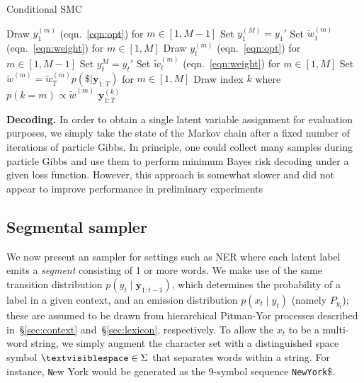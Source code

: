 \documentclass[11pt]{article}
\newcommand{\EOS}{\$}
\newcommand{\delim}{\textvisiblespace}
\begin{document}
\begin{algorithm}[t]
   \caption{Conditional SMC}\label{alg:pgkernel}
   \begin{algorithmic}[1] 
     \State Draw $y_1^{(m)}$ (eqn.\ \ref{eqn:opt}) for $m \in [1, M-1]$
     \State Set $y_1^{(M)} = y_1'$ 
     \State Set $\tilde{w}_1^{(m)}$ (eqn.\ \ref{eqn:weight}) for $m \in [1, M]$
     \State Draw $y_t^{(m)}$ (eqn.\ \ref{eqn:opt}) for $m \in [1, M-1]$
     \State Set $y_t^{M} = y_t'$ 
     \State Set $\tilde{w}_t^{(m)}$ (eqn.\ \ref{eqn:weight}) for $m \in [1, M]$
     \EndFor
     \State Set $\tilde{w}^{(m)} \!=\! \tilde{w}_T^{(m)}p(\EOS|\bm{y}_{1:T})$ for $m \in [1, M]$
     \State Draw index $k$ where $p(k=m) \propto \tilde{w}^{(m)}$
     \State \Return $\bm{y}^{(k)}_{1:T}$
     \EndProcedure
   \end{algorithmic}
\end{algorithm}

\vspace{5pt}

\noindent \textbf{Decoding.} In order to obtain a single latent
variable assignment for evaluation purposes, we simply take the state of the
Markov chain after a fixed number of iterations of particle Gibbs. In
principle, one could collect many samples during particle Gibbs and use them
to perform minimum Bayes risk decoding
under a given loss function.  However, this approach is somewhat slower and did
not appear to improve performance in preliminary experiments

\subsection{Segmental sampler}\label{sec:inf2}

We now present an sampler for settings such as NER where each latent label emits a {\em segment} consisting of 1 or more words.
We make use of the same transition distribution $p(y_t \mid \bm{y}_{1:t-1})$, which determines the probability of a label in a given context, and an emission
distribution $p(x_t \mid y_t)$ (namely $P_{y_t}$); these are assumed to be drawn from hierarchical Pitman-Yor processes described in~\S\ref{sec:context} and~\S\ref{sec:lexicon}, respectively. To allow the $x_t$ to be a multi-word string, we simply augment the character set with a distinguished space symbol $\delim \in \Sigma$ that separates words within a string.  For instance, {\texttt New York} would be generated as the 9-symbol sequence \texttt{New{\delim}York}\EOS.
\end{document}
